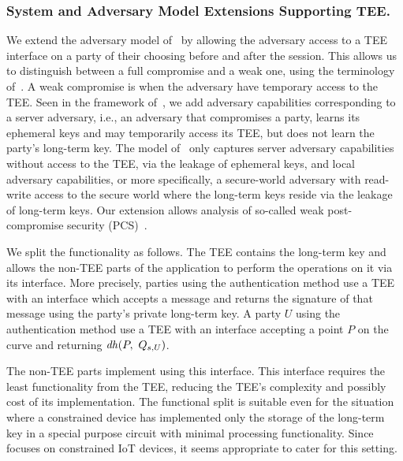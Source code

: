 \subsubsection{System and Adversary Model Extensions Supporting TEE.}
\label{sec:TEE:advModel}
%
We extend the adversary model of~\cite{Norr21} by allowing the adversary
access to a TEE interface on a party of their choosing before and after the
\mEdhoc{} session.
%
This allows us to distinguish between a full compromise and a weak one, 
using
the terminology of~\cite{DBLP:conf/csfw/Cohn-GordonCG16}.
%
A weak compromise is when the adversary have temporary access to the TEE.
%
Seen in the framework of~\cite{DBLP:conf/icics/XuZRWTZ20}, we add 
adversary
capabilities corresponding to a server adversary, i.e., an adversary that
compromises a party, learns its ephemeral keys and may temporarily access its
TEE, but does not learn the party's long-term key.
%
The model of~\cite{Norr21} only captures server adversary capabilities without
access to the TEE, via the leakage of ephemeral keys, and local adversary
capabilities, or more specifically, a secure-world adversary with read-write
access to the
secure world where the long-term keys reside via the leakage of long-term 
keys.
%
Our extension allows analysis of so-called weak post-compromise security
(PCS)~\cite{DBLP:conf/csfw/Cohn-GordonCG16}.
%

We split the \mEdhoc{} functionality as follows.
%
The TEE contains the long-term key and allows the non-TEE parts of the
application to perform the operations on it via its interface.
%
More precisely, parties using the \mSig{} authentication method use a TEE 
with
an interface which accepts a message and returns the signature of that 
message
using the party's private long-term key.
%
A party $U$ using the \mStat{} authentication method use a TEE with an 
interface
accepting a point $P$ on the curve and returning $\mDH(P,\ \mGu{})$.
%

The non-TEE parts implement \mEdhoc{} using this interface.
%
This interface requires the least functionality from the TEE, reducing the 
TEE's
complexity and possibly cost of its implementation.
%
The functional split is suitable even for the situation where a
constrained device has implemented only the storage of the long-term key in 
a
special purpose circuit with minimal processing functionality.
%
Since \mEdhoc{} focuses on constrained IoT devices, it seems appropriate to
cater for this setting.
%


